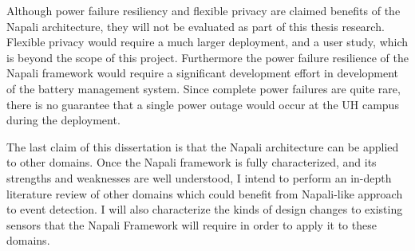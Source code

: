 Although power failure resiliency and flexible privacy are claimed benefits of the Napali architecture, they will not be evaluated as part of this thesis research. Flexible privacy would require a much larger deployment, and a user study, which is beyond the scope of this project. Furthermore the power failure resilience of the Napali framework would require a significant development effort in development of the battery management system. Since complete power failures are quite rare, there is no guarantee that a single power outage would occur at the UH campus during the deployment. 

The last claim of this dissertation is that the Napali architecture can be applied to other domains. Once the Napali framework is fully characterized, and its strengths and weaknesses are well understood, I intend to perform an in-depth literature review of other domains which could benefit from Napali-like approach to event detection. I will also characterize the kinds of design changes to existing sensors that the Napali Framework will require in order to apply it to these domains.

